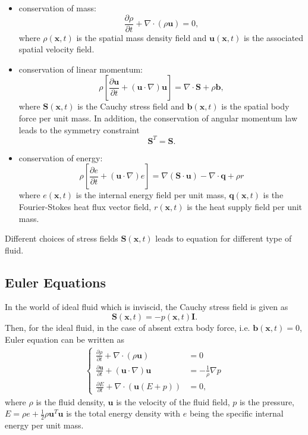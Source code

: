 \begin{itemize}
\item conservation of mass: 
\begin{equation}
\frac{\partial\rho}{\partial t}+\nabla\cdot\left(\rho\mathbf{u}\right)=0, 
\label{eqn:mass_con}
\end{equation}
where $\rho(\mathbf{x},t)$ is the spatial mass density field and 
$\mathbf{u}(\mathbf{x},t)$ is the associated spatial velocity field.
\item conservation of linear momentum:
\begin{equation}
\rho [\frac{\partial \mathbf{u}}{\partial t} + (\mathbf{u} \cdot \nabla) \mathbf{u}] = \nabla \cdot \mathbf{S} + \rho \mathbf{b}, 
\label{eqn:momentum_con}
\end{equation}
where $\mathbf{S}(\mathbf{x},t)$ is the Cauchy stress field and 
$\mathbf{b}(\mathbf{x},t)$ is the spatial body force per unit mass.
In addition, the conservation of angular momentum law leads to the 
symmetry constraint 
\begin{equation}
\mathbf{S}^{T}=\mathbf{S}.
\end{equation}
\item conservation of energy: 
\begin{equation}
\rho [\frac{\partial e}{\partial t} + (\mathbf{u} \cdot \nabla) e] = \nabla (\mathbf{S} \cdot \mathbf{u}) - \nabla \cdot \mathbf{q} + \rho r
\end{equation}
where $e(\mathbf{x},t)$ is the internal energy field per unit mass, 
$\mathbf{q}(\mathbf{x},t)$ is the Fourier-Stokes heat flux vector field, 
$r(\mathbf{x},t)$ is the heat supply field per unit mass.
\end{itemize}
Different choices of stress fields $\mathbf{S}(\mathbf{x},t)$ leads to 
equation for different type of fluid. 

\subsection*{Euler Equations}
In the world of ideal fluid which is inviscid, the Cauchy stress field is 
given as
\begin{equation}
\mathbf{S}(\mathbf{x},t) = -p(\mathbf{x},t)\mathbf{I}.
\end{equation}
Then, for the ideal fluid, in the case of absent extra body force, i.e. 
$\mathbf{b}(\mathbf{x},t) = 0$, Euler equation can be written as
\begin{eqnarray}
\left\{
\begin{aligned}
\frac{\partial \rho}{\partial t} + \nabla \cdot (\rho\mathbf{u}) &= 0 \\
\frac{\partial \mathbf{u}}{\partial t} + (\mathbf{u} \cdot \nabla) \mathbf{u} &= -\frac{1}{\rho} \nabla p \\
\frac{\partial E}{\partial t} + \nabla \cdot (\mathbf{u}(E + p)) &= 0, 
\end{aligned}
\right.
\label{eqn:Euler_eqns}
\end{eqnarray}
where $\rho$ is the fluid density, $\mathbf{u}$ is the velocity of
the fluid field, $p$ is the pressure, 
$E = \rho e + \frac{1}{2} \rho \mathbf{u}^{T} \mathbf{u}$
is the total energy density with $e$ being the specific internal
energy per unit mass. 

